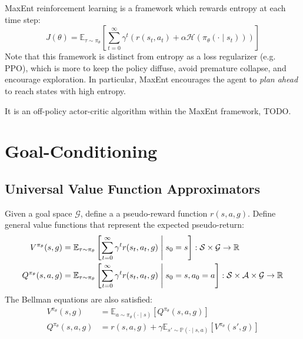 \documentclass[11pt, letterpaper]{article}
\begin{document}
\begin{concept}
    MaxEnt reinforcement learning is a framework which rewards entropy at each time step: 
    \[
        J(\theta) = \mathbb{E}_{\tau \sim \pi_\theta} \left[ \sum_{t=0}^\infty \gamma^t (r(s_t, a_t) + \alpha \mathcal{H}(\pi_\theta(\cdot \mid s_t))) \right]
    \]
    Note that this framework is distinct from entropy as a loss regularizer (e.g. PPO), which is more to keep the policy diffuse, avoid premature collapse, and encourage exploration. In particular, MaxEnt encourages the agent to \textit{plan ahead} to reach states with high entropy. 
\end{concept}

\begin{concept}
    It is an off-policy actor-critic algorithm within the MaxEnt framework, TODO. 
\end{concept}

\newpage
\section{Goal-Conditioning}

\subsection{Universal Value Function Approximators}

\begin{concept} 
    Given a goal space \(\mathcal{G}\), define a a pseudo-reward function \(r(s, a, g)\). Define general value functions that represent the expected pseudo-return: 
    \begin{align*}
        V^{\pi_\theta}(s, g) &= \mathbb{E}_{\tau \sim \pi_\theta} \left[ \sum_{t=0}^\infty \gamma^t r(s_t, a_t, g) \;\middle|\; s_0 = s \right] : \mathcal{S} \times \mathcal{G} \to \mathbb{R} \\
        Q^{\pi_\theta}(s, a, g) &= \mathbb{E}_{\tau \sim \pi_\theta} \left[ \sum_{t=0}^\infty \gamma^t r(s_t, a_t, g) \;\middle|\; s_0 = s, a_0 = a \right] : \mathcal{S} \times \mathcal{A} \times \mathcal{G} \to \mathbb{R}
    \end{align*}
    The Bellman equations are also satisfied: 
    \begin{align*}
        V^{\pi_\theta}(s, g) &= \mathbb{E}_{a \sim \pi_\theta(\cdot \mid s)}[Q^{\pi_\theta}(s, a, g)] \\
        Q^{\pi_\theta}(s, a, g) &= r(s, a, g) + \gamma \mathbb{E}_{s' \sim \mathbb{P}(\cdot \mid s, a)}[V^{\pi_\theta}(s', g)]
    \end{align*}
\end{concept}
\end{document}
